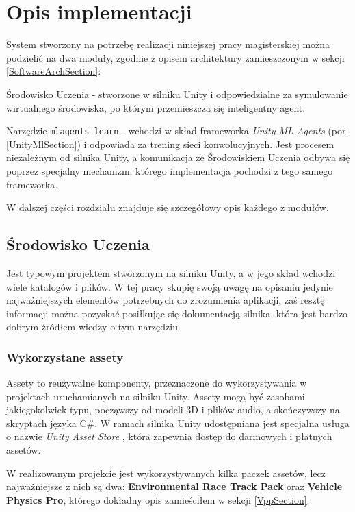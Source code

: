 \chapter{Opis implementacji}
\label{ImplementationChapter}
System stworzony na potrzebę realizacji niniejszej pracy magisterskiej można podzielić na dwa moduły, zgodnie z opisem architektury zamieszczonym w sekcji \ref{SoftwareArchSection}:
\begin{enumerate*}
\item Środowisko Uczenia - stworzone w silniku Unity i odpowiedzialne za symulowanie wirtualnego środowiska, po którym przemieszcza się inteligentny agent.
\item Narzędzie \texttt{mlagents\_learn} - wchodzi w skład frameworka \textit{Unity ML-Agents} (por. \ref{UnityMlSection}) i odpowiada za trening sieci konwolucyjnych. Jest procesem niezależnym od silnika Unity, a komunikacja ze Środowiskiem Uczenia odbywa się poprzez specjalny mechanizm, którego implementacja pochodzi z tego samego frameworka.
\end{enumerate*}

W dalszej części rozdziału znajduje się szczegółowy opis każdego z modułów.

\section{Środowisko Uczenia}
Jest typowym projektem stworzonym na silniku Unity, a w jego skład wchodzi wiele katalogów i plików. W tej pracy skupię swoją uwagę na opisaniu jedynie najważniejszych elementów potrzebnych do zrozumienia aplikacji, zaś resztę informacji można pozyskać posiłkując się dokumentacją silnika, która jest bardzo dobrym źródłem wiedzy o tym narzędziu.

\subsection{Wykorzystane assety}
Assety to reużywalne komponenty, przeznaczone do wykorzystywania w projektach uruchamianych na silniku Unity. Assety mogą być zasobami jakiegokolwiek typu, począwszy od modeli 3D i plików audio, a skończywszy na skryptach języka C\#. W ramach silnika Unity udostępniana jest specjalna usługa o nazwie \textit{Unity Asset Store} \cite{unity:assetStore}, która zapewnia dostęp do darmowych i płatnych assetów.

W realizowanym projekcie jest wykorzystywanych kilka paczek assetów, lecz najważniejsze z nich są dwa: \textbf{Environmental Race Track Pack} oraz \textbf{Vehicle Physics Pro}, którego dokładny opis zamieściłem w sekcji \ref{VppSection}.

